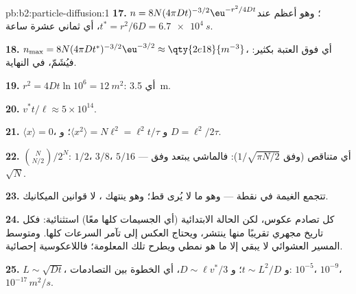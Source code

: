 \begin{solution}{pb:b2:particle-diffusion:1}
\textbf{17.} $n = 8N(4\pi Dt)^{-3/2}\eu^{-r^2/4Dt}$؛ وهو أعظم عند $t^* = r^2/6D =
\qty{6.7e4}{s}$، أي ثماني عشرة ساعة.

\textbf{18.} $n_{\max} = 8N(4\pi Dt^*)^{-3/2}\eu^{-3/2} \approx \qty{2e18}{m^{-3}}$،
أي فوق العتبة بكثير: فيُشَمّ، في النهاية.

\textbf{19.} $r^2 = 4Dt\ln 10^6 = \qty{12}{m^2}$: أي \qty{3.5}{m}.

\textbf{20.} $v^*t/\ell \approx 5 \times 10^{14}$.

\textbf{21.} $\langle x\rangle = 0$، و $\langle x^2\rangle = N\ell^2 = \ell^2 t/\tau$؛
و $D = \ell^2/2\tau$.

\textbf{22.} $\binom{N}{N/2}/2^N$: $1/2$، $3/8$، $5/16$ --- أي متناقص
(وفق $1/\sqrt{\pi N/2}$): فالماشي يبتعد وفق $\sqrt N$.

\textbf{23.} تتجمع الغيمة في نقطة --- وهو ما لا يُرى قط؛ وهو
ينتهك ، لا قوانين الميكانيك.

\textbf{24.} كل تصادم عكوس، لكن الحالة الابتدائية (أي الجسيمات
كلها معًا) استثنائية: فكل تاريخ مجهري تقريبًا
منها ينتشر، ويحتاج العكس إلى تآمر السرعات
كلها. ومتوسط المسير العشوائي لا يبقي إلا ما هو نمطي
ويطرح تلك المعلومة؛ فاللاعكوسية إحصائية.

\textbf{25.} $L \sim \sqrt{Dt}$، و $t \sim L^2/D$؛ و $D \sim \ell v^*/3$، أي
الخطوة بين التصادمات: $10^{-5}$، $10^{-9}$، $10^{-17}\,\unit{m^2/s}$.
\end{solution}
